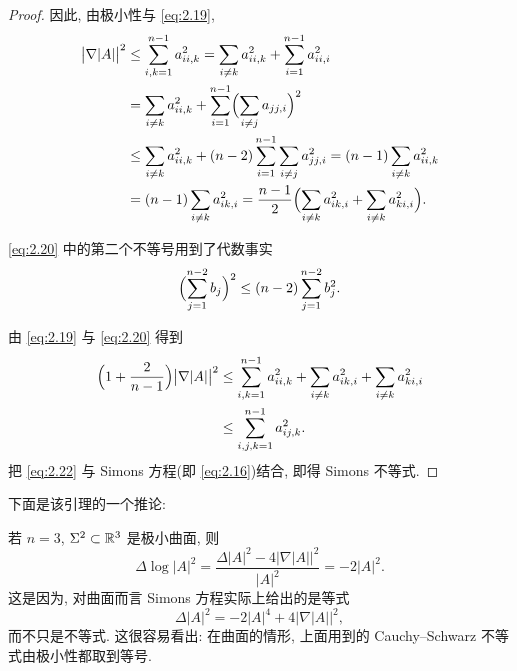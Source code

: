 \begin{proof}
因此, 由极小性与 \eqref{eq:2.19},
\begin{equation}
\begin{aligned}
\bigl|\nabla|A|\bigr|^{2}
&\leq\sum_{i,k=1}^{n-1}a_{ii,k}^{2}
 =\sum_{i\neq k}a_{ii,k}^{2}+\sum_{i=1}^{n-1}a_{ii,i}^{2}\\
&=\sum_{i\neq k}a_{ii,k}^{2}
 +\sum_{i=1}^{n-1}\Bigl(\sum_{i\neq j}a_{jj,i}\Bigr)^{2}\\
&\leq\sum_{i\neq k}a_{ii,k}^{2}
 +(n-2)\sum_{i=1}^{n-1}\sum_{i\neq j}a_{jj,i}^{2}
 =(n-1)\sum_{i\neq k}a_{ii,k}^{2}\\
&=(n-1)\sum_{i\neq k}a_{ik,i}^{2}
 =\frac{n-1}{2}\Bigl(\sum_{i\neq k}a_{ik,i}^{2}
 +\sum_{i\neq k}a_{ki,i}^{2}\Bigr).
\end{aligned}
\label{eq:2.20}
\end{equation}

\eqref{eq:2.20} 中的第二个不等号用到了代数事实
\begin{equation}
\Bigl(\sum_{j=1}^{n-2}b_j\Bigr)^{2}\leq(n-2)\sum_{j=1}^{n-2}b_j^{2}.
\label{eq:2.21}
\end{equation}

由 \eqref{eq:2.19} 与 \eqref{eq:2.20} 得到
\begin{equation}
\begin{aligned}
\Bigl(1+\frac{2}{n-1}\Bigr)\bigl|\nabla|A|\bigr|^{2}
&\leq\sum_{i,k=1}^{n-1}a_{ii,k}^{2}+\sum_{i\neq k}a_{ik,i}^{2}
 +\sum_{i\neq k}a_{ki,i}^{2}\\
&\leq\sum_{i,j,k=1}^{n-1}a_{ij,k}^{2}.
\end{aligned}
\label{eq:2.22}
\end{equation}
把 \eqref{eq:2.22} 与 Simons 方程(即 \eqref{eq:2.16})结合, 即得 Simons 不等式.
\end{proof}

下面是该引理的一个推论:

若 $n=3$, $\Sigma^2\subset\mathbb{R}^3$ 是极小曲面, 则
\begin{equation}
\Delta\log|A|^{2}
 =\frac{\Delta|A|^{2}-4\bigl|\nabla|A|\bigr|^{2}}{|A|^{2}}
 =-2|A|^{2}.
\label{eq:2.23}
\end{equation}
这是因为, 对曲面而言 Simons 方程实际上给出的是等式
\begin{equation}
\Delta|A|^{2}=-2|A|^{4}+4\bigl|\nabla|A|\bigr|^{2},
\label{eq:2.24}
\end{equation}
而不只是不等式. 这很容易看出: 在曲面的情形, 上面用到的 Cauchy--Schwarz
不等式由极小性都取到等号.

